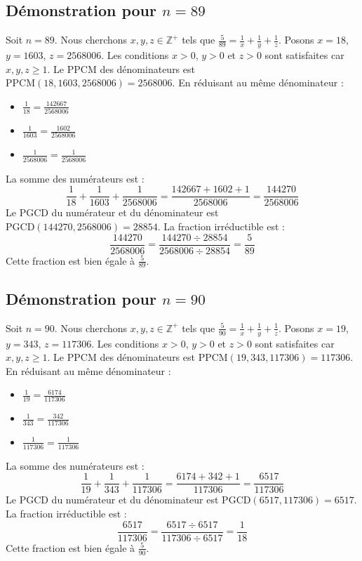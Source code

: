 \documentclass[11pt,a4paper]{article}
\begin{document}
\subsection{Démonstration pour $n = 89$}
Soit $n = 89$. Nous cherchons $x, y, z \in \mathbb{Z}^{+}$ tels que $\frac{5}{89} = \frac{1}{x} + \frac{1}{y} + \frac{1}{z}$.
Posons $x = 18$, $y = 1603$, $z = 2568006$.
Les conditions $x > 0$, $y > 0$ et $z > 0$ sont satisfaites car $x, y, z \geq 1$.
Le PPCM des dénominateurs est $\text{PPCM}(18, 1603, 2568006) = 2568006$.
En réduisant au même dénominateur :
\begin{itemize}
    \item $\frac{1}{18} = \frac{142667}{2568006}$
    \item $\frac{1}{1603} = \frac{1602}{2568006}$
    \item $\frac{1}{2568006} = \frac{1}{2568006}$
\end{itemize}
La somme des numérateurs est :
$$ \frac{1}{18} + \frac{1}{1603} + \frac{1}{2568006} = \frac{142667 + 1602 + 1}{2568006} = \frac{144270}{2568006} $$
Le PGCD du numérateur et du dénominateur est $\text{PGCD}(144270, 2568006) = 28854$.
La fraction irréductible est :
$$ \frac{144270}{2568006} = \frac{144270 \div 28854}{2568006 \div 28854} = \frac{5}{89} $$
Cette fraction est bien égale à $\frac{5}{89}$.

\subsection{Démonstration pour $n = 90$}
Soit $n = 90$. Nous cherchons $x, y, z \in \mathbb{Z}^{+}$ tels que $\frac{5}{90} = \frac{1}{x} + \frac{1}{y} + \frac{1}{z}$.
Posons $x = 19$, $y = 343$, $z = 117306$.
Les conditions $x > 0$, $y > 0$ et $z > 0$ sont satisfaites car $x, y, z \geq 1$.
Le PPCM des dénominateurs est $\text{PPCM}(19, 343, 117306) = 117306$.
En réduisant au même dénominateur :
\begin{itemize}
    \item $\frac{1}{19} = \frac{6174}{117306}$
    \item $\frac{1}{343} = \frac{342}{117306}$
    \item $\frac{1}{117306} = \frac{1}{117306}$
\end{itemize}
La somme des numérateurs est :
$$ \frac{1}{19} + \frac{1}{343} + \frac{1}{117306} = \frac{6174 + 342 + 1}{117306} = \frac{6517}{117306} $$
Le PGCD du numérateur et du dénominateur est $\text{PGCD}(6517, 117306) = 6517$.
La fraction irréductible est :
$$ \frac{6517}{117306} = \frac{6517 \div 6517}{117306 \div 6517} = \frac{1}{18} $$
Cette fraction est bien égale à $\frac{5}{90}$.
\end{document}
